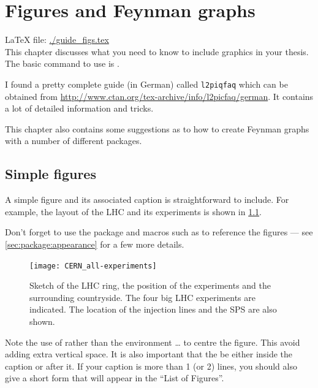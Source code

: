 
\chapter{Figures and Feynman graphs}%
\label{sec:fig}

\LaTeX{} file: \url{./guide_figs.tex}\\[1ex]
\noindent
This chapter discusses what you need to know to include graphics in
your thesis. The basic command to use is .

I found a pretty complete guide (in German) called \texttt{l2piqfaq}
which can be obtained from
\url{http://www.ctan.org/tex-archive/info/l2picfaq/german}. It contains
a lot of detailed information and tricks.

This chapter also contains some suggestions as to how to create Feynman
graphs with a number of different packages.


\section{Simple figures}%
\label{sec:fig:simple}

A simple figure and its associated caption is straightforward to include.
For example, the layout of the LHC and its experiments is
shown in \cref{fig:LHC}.

Don't forget to use the package  and macros such as 
to reference the figures --- see \cref{sec:package:appearance} for a few more details.

\begin{figure}[htbp]
  \centering
  \texttt{[image: CERN\_all-experiments]}
  \caption[Sketch of the LHC ring, the position of the experiments and
  the surrounding countryside.]{Sketch of the LHC ring, the position
    of the experiments and the surrounding countryside. The four big
    LHC experiments are indicated. The location of the injection lines
    and the SPS are also shown.}%
  \label{fig:LHC}
\end{figure}

Note the use of  rather than the environment
 \ldots {} to centre the figure. This
avoid adding extra vertical space. It is also important that the
 be either inside the caption or after it. If your
caption is more than 1 (or 2) lines, you should also give a short form
that will appear in the ``List of Figures''.

